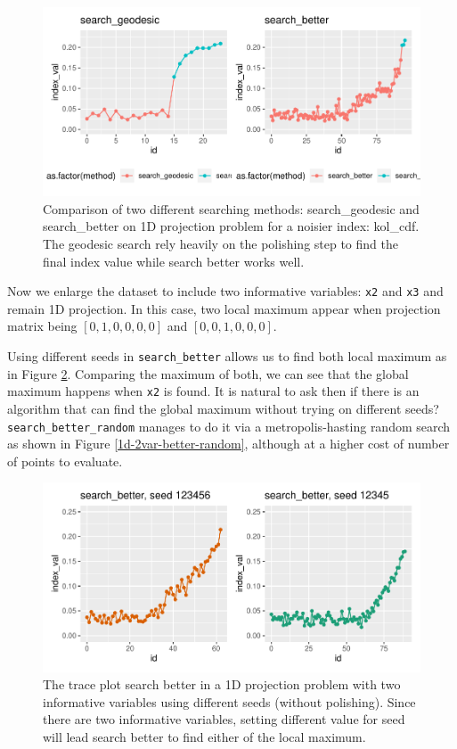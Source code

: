 \documentclass[12pt]{article}
\begin{document}
\begin{figure}
\centering
\includegraphics{paper_files/figure-latex/kol-cdf-1.pdf}
\caption{\label{kol-cdf}Comparison of two different searching methods:
search\_geodesic and search\_better on 1D projection problem for a
noisier index: kol\_cdf. The geodesic search rely heavily on the
polishing step to find the final index value while search better works
well.}
\end{figure}

Now we enlarge the dataset to include two informative variables:
\texttt{x2} and \texttt{x3} and remain 1D projection. In this case, two
local maximum appear when projection matrix being \([0, 1, 0, 0, 0, 0]\)
and \([0, 0, 1 ,0, 0, 0]\).

Using different seeds in \texttt{search\_better} allows us to find both
local maximum as in Figure \ref{1d-2var-different-seeds}. Comparing the
maximum of both, we can see that the global maximum happens when
\texttt{x2} is found. It is natural to ask then if there is an algorithm
that can find the global maximum without trying on different seeds?
\texttt{search\_better\_random} manages to do it via a
metropolis-hasting random search as shown in Figure
\ref{1d-2var-better-random}, although at a higher cost of number of
points to evaluate.

\begin{figure}
\centering
\includegraphics{paper_files/figure-latex/1d-2var-different-seeds-1.pdf}
\caption{\label{1d-2var-different-seeds}The trace plot search better in
a 1D projection problem with two informative variables using different
seeds (without polishing). Since there are two informative variables,
setting different value for seed will lead search better to find either
of the local maximum.}
\end{figure}
\end{document}
